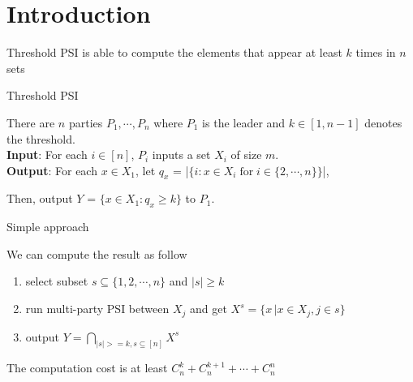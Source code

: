 \section{Introduction}
\begin{frame}
	Threshold PSI is able to compute the elements that appear at least $k$ times in $n$ sets
  
\begin{block}{Threshold PSI}

    There are $n$ parties $P_1,\cdots,P_n$ where $P_1$ is the leader and
    $k \in [1,n-1]$ denotes the threshold. \\

    \textbf{Input}: For each $i \in [n]$, $P_i$ inputs a set $X_i$ of size $m$.\\

    \textbf{Output}: For each $x \in X_1$, let $q_x$ = |$\{i: x \in X_i \; \text{for} \; i \in \{2,\cdots,n\} \}$|, 

    Then, output $Y$ = $\{x \in X_1 : q_x \geq  k \}$ to $P_1$.

\end{block}

\end{frame}

\begin{frame}{Simple approach}

    We can compute the result as follow 

    \begin{enumerate}
        \item select subset $s\subseteq \{1,2,\cdots,n\}$ and $|s| \geq k$
    
        \item run multi-party PSI between $X_j $ and get $X^s = \{x\,| x \in X_j , j \in s \}$
    
        \item output $Y = \bigcap\limits_{|s|>=k,s\subseteq [n]} X^s$
    \end{enumerate}

    \vspace{0.5cm}

    The computation cost is at least $C_n^k+C_n^{k+1}+\cdots +C_n^n$
    
    
    \vspace{0.5cm}

    \color{red}{inefficient and insecure !}

\end{frame}

